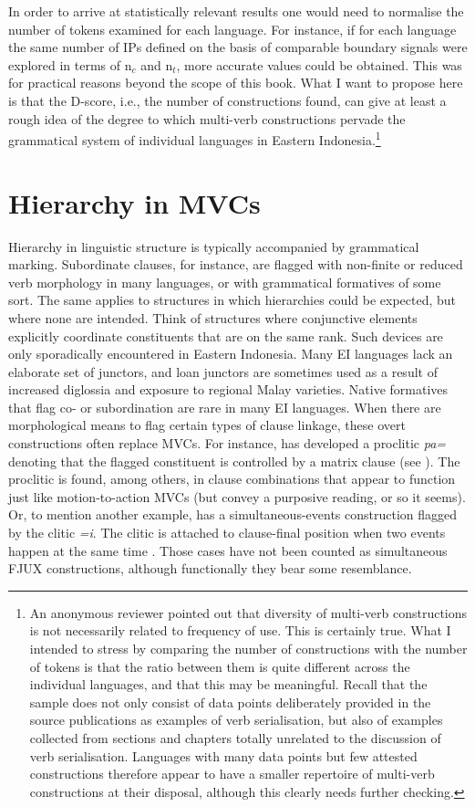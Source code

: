 In order to arrive at statistically relevant results one would need to normalise the number of tokens examined for each language. For instance, if for each language the same number of IPs defined on the basis of comparable boundary signals were explored in terms of n$_c$ and n$_t$, more accurate values could be obtained. This was for practical reasons beyond the scope of this book. What I want to propose here is that the D-score, i.e., the number of constructions found, can give at least a rough idea of the degree to which multi-verb constructions pervade the grammatical system of individual languages in Eastern Indonesia.\footnote{An anonymous reviewer pointed out that diversity of multi-verb constructions is not necessarily related to frequency of use. This is certainly true. What I intended to stress by comparing the number of constructions with the number of tokens is that the ratio between them is quite different across the individual languages, and that this may be meaningful. Recall that the sample does not only consist of data points deliberately provided in the source publications as examples of verb serialisation, but also of examples collected from sections and chapters totally unrelated to the discussion of verb serialisation. Languages with many data points but few attested constructions therefore appear to have a smaller repertoire of multi-verb constructions at their disposal, although this clearly needs further checking.}

\section{Hierarchy in MVCs} \label{sec:hierarchy}
\largerpage
Hierarchy in linguistic structure is typically accompanied by grammatical marking. Subordinate clauses, for instance, are flagged with non-finite or reduced verb morphology in many languages, or with grammatical formatives of some sort. The same applies to structures in which hierarchies could be expected, but where none are intended. Think of structures where conjunctive elements explicitly coordinate constituents that are on the same rank. Such devices are only sporadically encountered in Eastern Indonesia. Many EI languages lack an elaborate set of junctors, and  loan junctors are sometimes used as a result of increased diglossia and exposure to regional Malay varieties. Native formatives that flag co- or subordination are rare in many EI languages. When there are morphological means to flag certain types of clause linkage, these overt constructions often replace MVCs. For instance,  has developed a proclitic \textit{pa=} denoting that the flagged constituent is controlled by a matrix clause (see \citealt[338ff.]{klamer1998grammar}). The proclitic is found, among others, in clause combinations that appear to function just like motion-to-action MVCs (but convey a purposive reading, or so it seems). Or, to mention another example,  has a simultaneous-events construction flagged by the clitic \textit{=i}. The clitic is attached to clause-final position when two events happen at the same time \citep{berry1999}. Those cases have not been counted as simultaneous FJUX constructions, although functionally they bear some resemblance.

